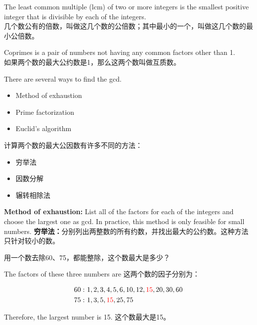 \begin{newdef}
The least common multiple (lcm) of two or more integers is the smallest positive integer that is divisible by each of the integers.  \\
几个数公有的倍数，叫做这几个数的公倍数；其中最小的一个，叫做这几个数的最小公倍数。
\end{newdef}

\begin{newdef}
Coprimes is a pair of numbers not having any common factors other than 1.  \\
如果两个数的最大公约数是1，那么这两个数叫做互质数。
\end{newdef}

\begin{paracol}{2}
There are several ways to find the gcd. \\ 
\begin{itemize}
\item Method of exhaustion
\item Prime factorization
\item Euclid's algorithm
\end{itemize}
\switchcolumn 
计算两个数的最大公因数有许多不同的方法：
\begin{itemize}
\item 穷举法
\item 因数分解
\item 辗转相除法
\end{itemize}
\end{paracol}


\begin{paracol}{2}
{\bf Method of exhaustion:} List all of the factors for each of the integers and choose the largest one as gcd. In practice, this method is only feasible for small numbers.
\switchcolumn 
{\bf 穷举法：}分别列出两整数的所有约数，并找出最大的公约数。这种方法只针对较小的数。
\end{paracol}

\begin{example}
用一个数去除60、75，都能整除，这个数最大是多少？
\end{example}
\begin{solution}
\begin{paracol}{2}
The factors of these three numbers are
\switchcolumn 
这两个数的因子分别为：
\end{paracol}
\begin{align*}
60:\ & 1,2,3,4,5,6,10,12,{\color{red} 15},20,30,60\\
75:\ & 1, 3, 5, {\color{red} 15}, 25, 75 
\end{align*}
\begin{paracol}{2}
Therefore, the largest number is 15.
\switchcolumn 
这个数最大是15。
\end{paracol}
\end{solution}

